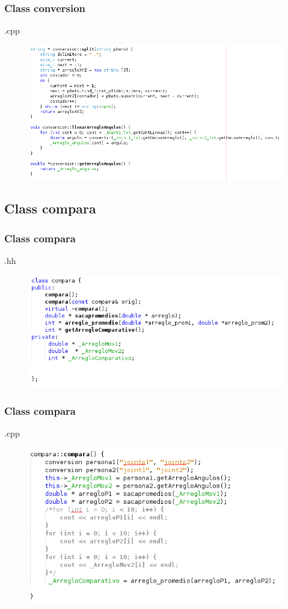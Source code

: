 \documentclass{beamer}
\begin{document}

\begin{frame}
\frametitle{Class conversion}
.cpp

\begin{figure}
\includegraphics[width=0.8\linewidth]{18.png}
\end{figure}


\end{frame}


\subsection{Class compara}

\begin{frame}
\frametitle{Class compara}
.hh

\begin{figure}
\includegraphics[width=0.6\linewidth]{19.png}
\end{figure}


\end{frame}


\begin{frame}
\frametitle{Class compara}
.cpp
\begin{figure}
\includegraphics[width=0.6\linewidth]{20.png}
\end{figure}


\end{frame}
\end{document}

